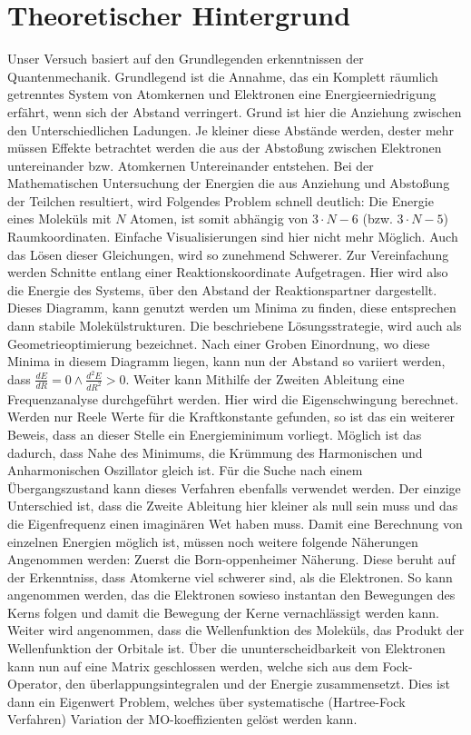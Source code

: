 \section{Theoretischer Hintergrund}
Unser Versuch basiert auf den Grundlegenden erkenntnissen der Quantenmechanik.
Grundlegend ist die Annahme, das ein Komplett räumlich getrenntes System von Atomkernen und Elektronen eine Energieerniedrigung erfährt, wenn sich der Abstand verringert.
Grund ist hier die Anziehung zwischen den Unterschiedlichen Ladungen. 
Je kleiner diese Abstände werden, dester mehr müssen Effekte betrachtet werden die aus der Abstoßung zwischen Elektronen untereinander bzw. Atomkernen Untereinander entstehen.
Bei der Mathematischen Untersuchung der Energien die aus Anziehung und Abstoßung der Teilchen resultiert, wird Folgendes Problem schnell deutlich:
Die Energie eines Moleküls mit $N$ Atomen, ist somit abhängig von $3\cdot N-6$ (bzw. $3\cdot N-5$) Raumkoordinaten.
Einfache Visualisierungen sind hier nicht mehr Möglich.
Auch das Lösen dieser Gleichungen, wird so zunehmend Schwerer.
Zur Vereinfachung werden Schnitte entlang einer Reaktionskoordinate Aufgetragen.
Hier wird also die Energie des Systems, über den Abstand der Reaktionspartner dargestellt.
Dieses Diagramm, kann genutzt werden um Minima zu finden, diese entsprechen dann stabile Molekülstrukturen.
Die beschriebene Lösungsstrategie, wird auch als Geometrieoptimierung bezeichnet.
Nach einer Groben Einordnung, wo diese Minima in diesem Diagramm liegen, kann nun der Abstand so variiert werden, dass $\frac{dE}{dR}=0\wedge \frac{d^2E}{dR^2}>0$.
Weiter kann Mithilfe der Zweiten Ableitung eine Frequenzanalyse durchgeführt werden.
Hier wird die Eigenschwingung berechnet.
Werden nur Reele Werte für die Kraftkonstante gefunden, so ist das ein weiterer Beweis, dass an dieser Stelle ein Energieminimum vorliegt.
Möglich ist das dadurch, dass Nahe des Minimums, die Krümmung des Harmonischen und Anharmonischen Oszillator gleich ist.
Für die Suche nach einem Übergangszustand kann dieses Verfahren ebenfalls verwendet werden.
Der einzige Unterschied ist, dass die Zweite Ableitung hier kleiner als null sein muss und das die Eigenfrequenz einen imaginären Wet haben muss.
Damit eine Berechnung von einzelnen Energien möglich ist, müssen noch weitere folgende Näherungen Angenommen werden:
Zuerst die Born-oppenheimer Näherung.
Diese beruht auf der Erkenntniss, dass Atomkerne viel schwerer sind, als die Elektronen.
So kann angenommen werden, das die Elektronen sowieso instantan den Bewegungen des Kerns folgen und damit die Bewegung der Kerne vernachlässigt werden kann.
Weiter wird angenommen, dass die Wellenfunktion des Moleküls, das Produkt der Wellenfunktion der Orbitale ist.
Über die ununterscheidbarkeit von Elektronen kann nun auf eine Matrix geschlossen werden, welche sich aus dem Fock-Operator, den überlappungsintegralen und der Energie zusammensetzt.
Dies ist dann ein Eigenwert Problem, welches über systematische (Hartree-Fock Verfahren) Variation der MO-koeffizienten gelöst werden kann. 
